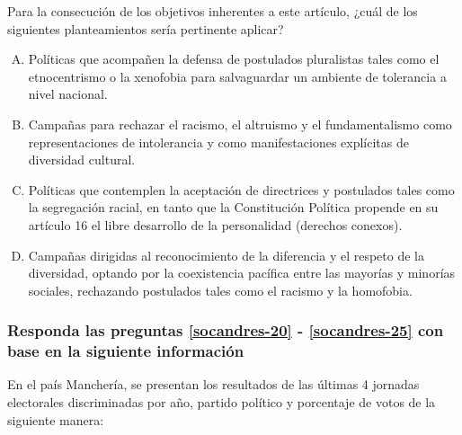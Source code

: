 \begin{enumerate}
Para la consecución de los objetivos inherentes a este artículo, ¿cuál de los siguientes planteamientos sería pertinente aplicar?


\begin{enumerate}[(A)]
\item Políticas que acompañen la defensa de postulados pluralistas tales como el etnocentrismo o la xenofobia para salvaguardar un ambiente de tolerancia a nivel nacional.
\item Campañas para rechazar el racismo, el altruismo y el fundamentalismo como representaciones de intolerancia y como manifestaciones explícitas de diversidad cultural.
\item Políticas que contemplen la aceptación de directrices y postulados tales como la segregación racial, en tanto que la Constitución Política propende en su artículo 16 el libre desarrollo de la personalidad (derechos conexos).
\item Campañas dirigidas al reconocimiento de la diferencia y el respeto de la diversidad, optando por la coexistencia pacífica entre las mayorías y minorías sociales, rechazando postulados tales como el racismo y la homofobia. 
\end{enumerate}

\subsubsection*{Responda las preguntas \ref{socandres-20} - \ref{socandres-25} con base en la siguiente información}

En el país Manchería, se presentan los resultados de las últimas 4 jornadas electorales discriminadas por año, partido político y porcentaje de votos de la siguiente manera: 


\vfill


\end{enumerate}
